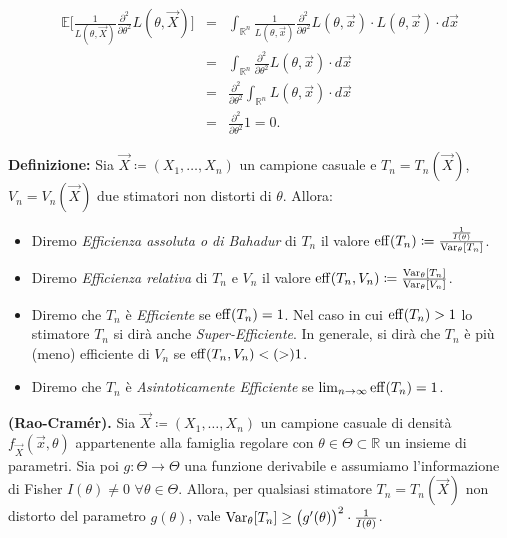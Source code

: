 \begin{itemize}
\begin{eqnarray*}
\mathbb{E}\Big[\frac{1}{L(\theta,\vec{X})}\frac{\partial^2}{\partial\theta^2}L(\theta,\vec{X})\Big]
&=& \int_{\mathbb{R}^n} \frac{1}{L(\theta,\vec{x})}\frac{\partial^2}{\partial\theta^2}L(\theta,\vec{x})\cdot L(\theta,\vec{x})\cdot d\vec{x} \\
&=& \int_{\mathbb{R}^n} \frac{\partial^2}{\partial\theta^2}L(\theta,\vec{x})\cdot d\vec{x} \\
&=& \frac{\partial^2}{\partial\theta^2}\int_{\mathbb{R}^n} L(\theta,\vec{x})\cdot d\vec{x} \\
&=& \frac{\partial^2}{\partial\theta^2} 1=0.
\end{eqnarray*}
\end{itemize}
\textbf{Definizione:} Sia $\vec{X}\coloneqq (X_1,\ldots,X_n)$ un campione casuale e $T_n=T_n(\vec{X})$, $V_n=V_n(\vec{X})$ due stimatori non distorti di $\theta$. Allora:
\begin{itemize}[noitemsep]
\item Diremo \textit{Efficienza assoluta o di Bahadur} di $T_n$ il valore $\operatorname{eff}(T_n)\coloneqq \frac{\frac{1}{I(\theta)}}{\operatorname{Var}_\theta[T_n]}$.
\item Diremo \textit{Efficienza relativa} di $T_n$ e $V_n$ il valore $\operatorname{eff}(T_n,V_n)\coloneqq \frac{\operatorname{Var}_\theta[T_n]}{\operatorname{Var}_\theta[V_n]}$.
\item Diremo che $T_n$ è \textit{Efficiente} se $\operatorname{eff}(T_n)=1$. Nel caso in cui $\operatorname{eff}(T_n)>1$ lo stimatore $T_n$ si dirà anche \textit{Super-Efficiente}. In generale, si dirà che $T_n$ è più (meno) efficiente di $V_n$ se $\operatorname{eff}(T_n,V_n)< (>)1$.
\item Diremo che $T_n$ è \textit{Asintoticamente Efficiente} se $\lim_{n\rightarrow\infty} \operatorname{eff}(T_n)=1$.
\end{itemize}
\begin{theorem} \textbf{(Rao-Cramér).}
Sia $\vec{X}\coloneqq (X_1,\ldots,X_n)$ un campione casuale di densità $f_{\vec{X}}(\vec{x},\theta)$ appartenente alla famiglia regolare con $\theta\in \Theta \subset \mathbb{R}$ un insieme di parametri. Sia poi $g:\Theta\longrightarrow \Theta$ una funzione derivabile e assumiamo l'informazione di Fisher $I(\theta)\neq 0$ $\forall \theta\in \Theta$. Allora, per qualsiasi stimatore $T_n=T_n(\vec{X})$ non distorto del parametro $g(\theta)$, vale $\operatorname{Var}_\theta[T_n]\geq \big(g'(\theta)\big)^2\cdot\frac{1}{I(\theta)}$.
\end{theorem}

